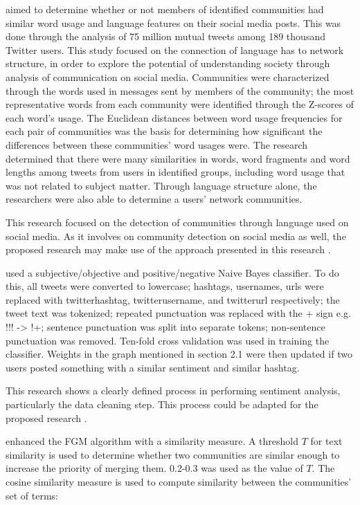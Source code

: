  aimed to determine whether or not members of identified communities had similar word usage and language features on their social media posts. This was done through the analysis of 75 million mutual tweets among 189 thousand Twitter users. This study focused on the connection of language has to network structure, in order to explore the potential of understanding society through analysis of communication on social media. Communities were characterized through the words used in messages sent by members of the community; the most representative words from each community were identified through the Z-scores of each word’s usage. The Euclidean distances between word usage frequencies for each pair of communities was the basis for determining how significant the differences between these communities’ word usages were. The research determined that there were many similarities in words, word fragments and word lengths among tweets from users in identified groups, including word usage that was not related to subject matter. Through language structure alone, the researchers were also able to determine a users' network communities.

This research focused on the detection of communities through language used on social media. As it involves on community detection on social media as well, the proposed research may make use of the approach presented in this research \cite{Bryden:2013}.

 used a subjective/objective and positive/negative Naive Bayes classifier. To do this, all tweets were converted to lowercase; hashtags, usernames, urls were replaced with twitterhashtag, twitterusername, and twitterurl respectively; the tweet text was tokenized; repeated punctuation was replaced with the + sign e.g. !!! -> !+; sentence punctuation was split into separate tokens; non-sentence punctuation was removed. Ten-fold cross validation was used in training the classifier. Weights in the graph mentioned in section 2.1 were then updated if two users posted something with a similar sentiment and similar hashtag. 

This research shows a clearly defined process in performing sentiment analysis, particularly the data cleaning step. This process could be adapted for the proposed research \cite{Deitrick:2013}.

 enhanced the FGM algorithm with a similarity measure. A threshold $T$ for text similarity is used to determine whether two communities are similar enough to increase the priority of merging them. 0.2-0.3 was used as the value of $T$. The cosine similarity measure is used to compute similarity between the communities' set of terms:

